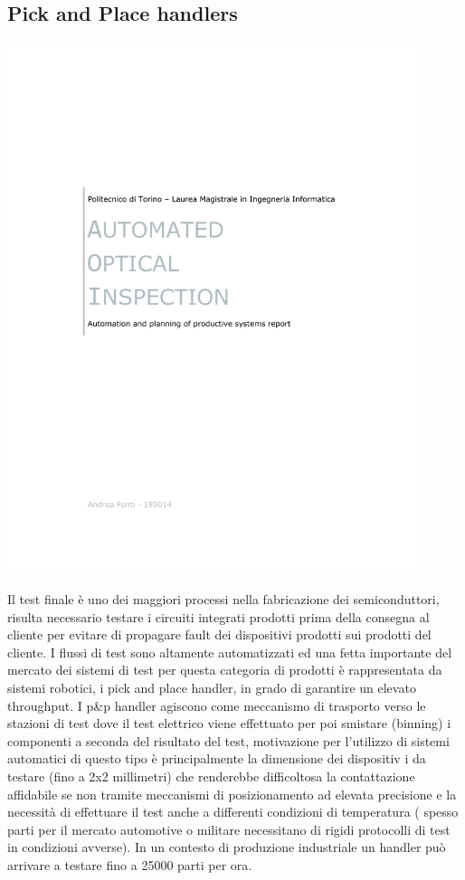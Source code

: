 \subsection{Pick and Place handlers}
\includegraphics[clip=true, trim= 50 260 50 320,page=21,width=0.9\textwidth]{materiale/tesina-carlucci.pdf}

Il test finale è uno dei maggiori processi nella fabricazione dei semiconduttori, risulta necessario testare  i circuiti integrati prodotti prima della consegna al cliente per evitare di propagare fault dei dispositivi prodotti sui prodotti del cliente. 
I flussi di test sono altamente automatizzati ed una fetta importante del mercato dei sistemi di test per 
questa categoria di prodotti è rappresentata da sistemi robotici, i pick and place handler, in grado di 
garantire un elevato throughput. 
I p\&p handler agiscono come meccanismo di trasporto verso le stazioni di test dove il test elettrico viene 
effettuato per poi smistare (binning) i componenti a seconda del risultato del test, motivazione per 
l’utilizzo di sistemi automatici di questo tipo è principalmente la dimensione dei dispositiv i da testare (fino a 2x2 millimetri) che renderebbe difficoltosa la contattazione affidabile se non tramite meccanismi di 
posizionamento ad elevata precisione e la necessità di effettuare il test anche a differenti condizioni di temperatura ( spesso parti per il mercato automotive o militare necessitano di rigidi protocolli di test in 
condizioni avverse). In un contesto di produzione industriale un handler può arrivare a testare fino a 
25000 parti per ora. 

